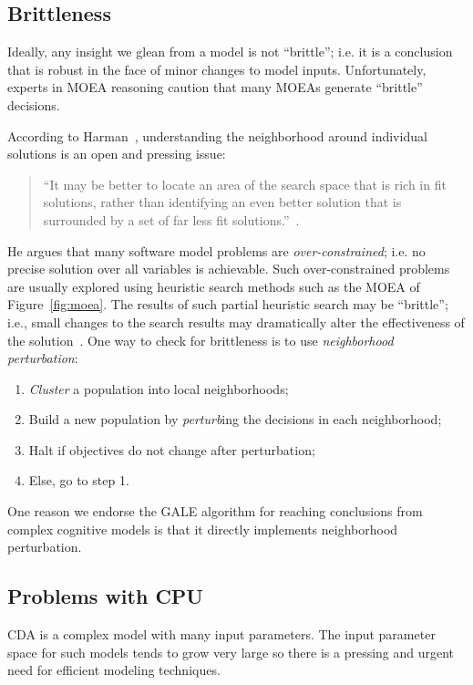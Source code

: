 \documentclass[journal]{IEEEtran}
\newcommand{\fig}[1]{Figure~\ref{fig:#1}}
\begin{document}
\subsection{Brittleness}

Ideally, any insight we glean from a model is not ``brittle''; i.e. it is a conclusion that is robust in the face of minor changes to model inputs.
Unfortunately, experts in MOEA reasoning caution that many MOEAs generate ``brittle'' decisions.

According to Harman~\cite{harman01}, understanding the neighborhood around individual solutions is an open and pressing issue:
\begin{quote}
 ``It may be better to locate an area of the search space that is rich in fit solutions, rather than identifying an even better solution that is surrounded by a set of far less fit solutions.''~\cite{harman04}.  
\end{quote}

He argues that many software model problems are {\em over-constrained}; i.e.  no precise solution over all variables is achievable.  
Such over-constrained problems are usually explored using heuristic search methods such as the MOEA of \fig{moea}.
The results of such partial heuristic search may be ``brittle''; i.e., small changes to the search results may dramatically alter the effectiveness of the solution~\cite{harman04}.  
 One way to check for brittleness is to use {\em neighborhood perturbation}:
\begin{enumerate}
\item {\em Cluster}  a  population into local neighborhoods;
\item  Build a new population by {\em perturb}ing the decisions in each neighborhood;
\item Halt if objectives do not change after perturbation;
\item Else, go to step 1.\end{enumerate}
One reason we endorse the GALE algorithm for reaching conclusions from complex cognitive models is that it directly implements neighborhood perturbation.



\subsection{Problems with CPU}\label{sec:cpu}
CDA is a complex model with many input parameters. 
The input parameter space for such models tends to grow very large so there is a pressing and urgent need for efficient modeling techniques.
\end{document}
